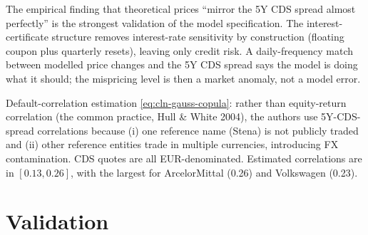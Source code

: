 \documentclass[11pt,a4paper]{article}
\begin{document}
\begin{commentary}
The empirical finding that theoretical prices ``mirror the 5Y CDS
spread almost perfectly'' is the strongest validation of the model
specification. The interest-certificate structure removes
interest-rate sensitivity by construction (floating coupon plus
quarterly resets), leaving only credit risk. A daily-frequency match
between modelled price changes and the 5Y CDS spread says the model
is doing what it should; the mispricing level is then a market
anomaly, not a model error.
\end{commentary}

\begin{commentary}
Default-correlation estimation \eqref{eq:cln-gauss-copula}: rather
than equity-return correlation (the common practice, Hull \& White
2004), the authors use 5Y-CDS-spread correlations because (i) one
reference name (Stena) is not publicly traded and (ii) other
reference entities trade in multiple currencies, introducing FX
contamination. CDS quotes are all EUR-denominated. Estimated
correlations are in $[0.13, 0.26]$, with the largest for ArcelorMittal
(0.26) and Volkswagen (0.23).
\end{commentary}

\section{Validation}
\end{document}
